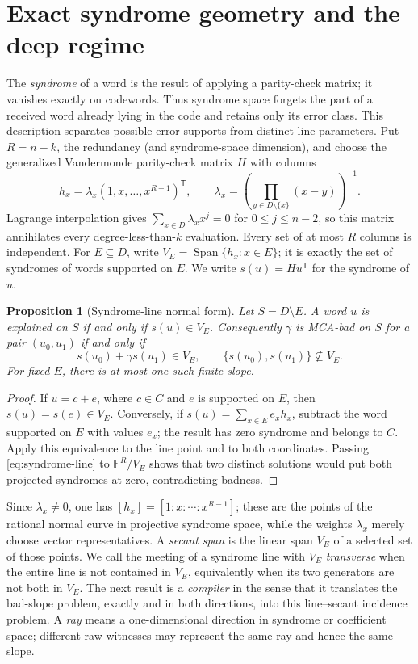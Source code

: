 \documentclass[11pt,a4paper]{amsart}
\numberwithin{equation}{section}
\newtheorem{proposition}[proposition]{Proposition}
\theoremstyle{remark}
\DeclareMathOperator{\Span}{Span}
\newcommand{\F}{\mathbb F}
\begin{document}
\section{Exact syndrome geometry and the deep regime}
\label{sec:syndrome-exact}

The \emph{syndrome} of a word is the result of applying a parity-check
matrix; it vanishes exactly on codewords.  Thus syndrome space forgets the
part of a received word already lying in the code and retains only its error
class.  This description separates possible error supports from distinct
line parameters.  Put \(R=n-k\), the redundancy (and syndrome-space
dimension), and choose the generalized Vandermonde parity-check matrix
\(H\) with columns
\[
 h_x=\lambda_x(1,x,\ldots,x^{R-1})^{\mathsf T},\qquad
 \lambda_x=\left(\prod_{y\in D\setminus\{x\}}(x-y)\right)^{-1}.
 \tag{3.1}\label{eq:parity-columns}
\]
Lagrange interpolation gives
\(\sum_{x\in D}\lambda_xx^j=0\) for \(0\le j\le n-2\), so this matrix
annihilates every degree-less-than-\(k\) evaluation.  Every set of at most
\(R\) columns is independent.  For \(E\subseteq D\), write
\(V_E=\Span\{h_x:x\in E\}\); it is exactly the set of syndromes of words
supported on \(E\).  We write \(s(u)=Hu^{\mathsf T}\) for the syndrome of
\(u\).

\begin{proposition}[Syndrome-line normal form]
\label{prop:syndrome-line-normal-form}
Let \(S=D\setminus E\).  A word \(u\) is explained on \(S\) if and only if
\(s(u)\in V_E\).  Consequently \(\gamma\) is MCA-bad on \(S\) for a pair
\((u_0,u_1)\) if and only if
\[
 s(u_0)+\gamma s(u_1)\in V_E,
 \qquad
 \{s(u_0),s(u_1)\}\not\subseteq V_E.
 \tag{3.2}\label{eq:syndrome-line}
\]
For fixed \(E\), there is at most one such finite slope.
\end{proposition}

\begin{proof}
If \(u=c+e\), where \(c\in C\) and \(e\) is supported on \(E\), then
\(s(u)=s(e)\in V_E\).  Conversely, if
\(s(u)=\sum_{x\in E}e_xh_x\), subtract the word supported on \(E\) with
values \(e_x\); the result has zero syndrome and belongs to \(C\).  Apply
this equivalence to the line point and to both coordinates.  Passing
\eqref{eq:syndrome-line} to \(\F^R/V_E\) shows that two distinct solutions
would put both projected syndromes at zero, contradicting badness.
\end{proof}

Since \(\lambda_x\ne0\), one has
\([h_x]=[1:x:\cdots:x^{R-1}]\); these are the points of the rational
normal curve in projective syndrome space, while the weights
\(\lambda_x\) merely choose vector representatives.  A \emph{secant span} is the linear span
\(V_E\) of a selected set of those points.  We call the meeting of a
syndrome line with \(V_E\) \emph{transverse} when the entire line is not
contained in \(V_E\), equivalently when its two generators are not both in
\(V_E\).  The next result is a \emph{compiler} in the sense that it
translates the bad-slope problem, exactly and in both directions, into this
line--secant incidence problem.  A \emph{ray} means a one-dimensional
direction in syndrome or coefficient space; different raw witnesses may
represent the same ray and hence the same slope.
\end{document}
